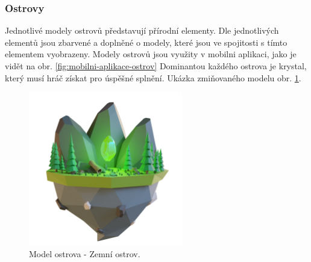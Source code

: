 \subsubsection{Ostrovy}
Jednotlivé modely ostrovů představují přírodní elementy. Dle jednotlivých elementů jsou zbarvené a doplněné o modely, které jsou ve spojitosti s tímto elementem vyobrazeny. Modely ostrovů jsou využity v mobilni aplikaci, jako je vidět na obr. \ref{fig:mobilni-aplikace-ostrov} Dominantou každého ostrova je krystal, který musí hráč získat pro úspěšné splnění. Ukázka zmiňovaného modelu obr. \ref{fig:nature-island}.

\begin{figure}[h]
    \centering
    \includegraphics[width=0.6\textwidth]{img/NatureIsland.png}
    \caption{Model ostrova - Zemní ostrov.}
    \label{fig:nature-island}
\end{figure}

